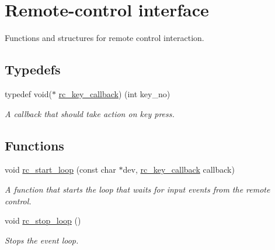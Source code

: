 \hypertarget{group__rc}{}\section{Remote-\/control interface}
\label{group__rc}


Functions and structures for remote control interaction.  


\subsection*{Typedefs}
\begin{DoxyCompactItemize}
\item 
typedef void($\ast$ \hyperlink{group__rc_gaa7ca8d3e24ef0c270366ce6fd9bcd258}{rc\+\_\+key\+\_\+callback}) (int key\+\_\+no)\hypertarget{group__rc_gaa7ca8d3e24ef0c270366ce6fd9bcd258}{}\label{group__rc_gaa7ca8d3e24ef0c270366ce6fd9bcd258}

\begin{DoxyCompactList}\small\item\em A callback that should take action on key press. \end{DoxyCompactList}\end{DoxyCompactItemize}
\subsection*{Functions}
\begin{DoxyCompactItemize}
\item 
void \hyperlink{group__rc_ga16d20af699334f6207d806701067ac96}{rc\+\_\+start\+\_\+loop} (const char $\ast$dev, \hyperlink{group__rc_gaa7ca8d3e24ef0c270366ce6fd9bcd258}{rc\+\_\+key\+\_\+callback} callback)
\begin{DoxyCompactList}\small\item\em A function that starts the loop that waits for input events from the remote control. \end{DoxyCompactList}\item 
void \hyperlink{group__rc_ga6d6de982bd06432345e8164a4c453fcc}{rc\+\_\+stop\+\_\+loop} ()\hypertarget{group__rc_ga6d6de982bd06432345e8164a4c453fcc}{}\label{group__rc_ga6d6de982bd06432345e8164a4c453fcc}

\begin{DoxyCompactList}\small\item\em Stops the event loop. \end{DoxyCompactList}\end{DoxyCompactItemize}


